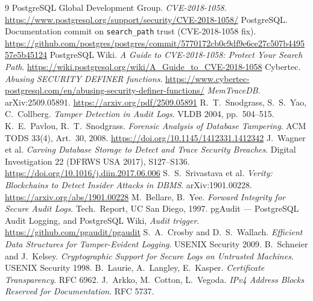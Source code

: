 \documentclass[11pt]{article}
\newcommand{\code}[1]{\texttt{#1}}
\begin{document}
\begin{thebibliography}{9}
 PostgreSQL Global Development Group. \emph{CVE-2018-1058}.
\url{https://www.postgresql.org/support/security/CVE-2018-1058/}
 PostgreSQL. Documentation commit on \code{search\_path} trust
(CVE-2018-1058 fix). \url{https://github.com/postgres/postgres/commit/5770172cb0c9df9e6ce27c507b449557e5b45124}
 PostgreSQL Wiki. \emph{A Guide to CVE-2018-1058: Protect Your Search Path}.
\url{https://wiki.postgresql.org/wiki/A_Guide_to_CVE-2018-1058}
 Cybertec. \emph{Abusing SECURITY DEFINER functions}.
\url{https://www.cybertec-postgresql.com/en/abusing-security-definer-functions/}
 \emph{MemTraceDB}. arXiv:2509.05891.
\url{https://arxiv.org/pdf/2509.05891}
 R.~T.~Snodgrass, S.~S.~Yao, C.~Collberg. \emph{Tamper Detection in
Audit Logs}. VLDB 2004, pp.~504--515.
 K.~E.~Pavlou, R.~T.~Snodgrass. \emph{Forensic Analysis of Database
Tampering}. ACM TODS 33(4), Art.~30, 2008. \url{https://doi.org/10.1145/1412331.1412342}
 J.~Wagner et al. \emph{Carving Database Storage to Detect and Trace
Security Breaches}. Digital Investigation 22 (DFRWS USA 2017), S127--S136.
\url{https://doi.org/10.1016/j.diin.2017.06.006}
 S.~S.~Srivastava et al. \emph{Verity: Blockchains to Detect Insider
Attacks in DBMS}. arXiv:1901.00228. \url{https://arxiv.org/abs/1901.00228}
 M.~Bellare, B.~Yee. \emph{Forward Integrity for Secure Audit Logs}.
Tech.\ Report, UC San Diego, 1997.
 pgAudit --- PostgreSQL Audit Logging, and PostgreSQL Wiki, \emph{Audit
trigger}. \url{https://github.com/pgaudit/pgaudit}
 S.~A.~Crosby and D.~S.~Wallach. \emph{Efficient Data Structures for
Tamper-Evident Logging}. USENIX Security 2009.
 B.~Schneier and J.~Kelsey. \emph{Cryptographic Support for Secure
Logs on Untrusted Machines}. USENIX Security 1998.
 B.~Laurie, A.~Langley, E.~Kasper. \emph{Certificate Transparency}. RFC 6962.
 J.~Arkko, M.~Cotton, L.~Vegoda. \emph{IPv4 Address Blocks Reserved for
Documentation}. RFC 5737.
\end{thebibliography}
\end{document}
